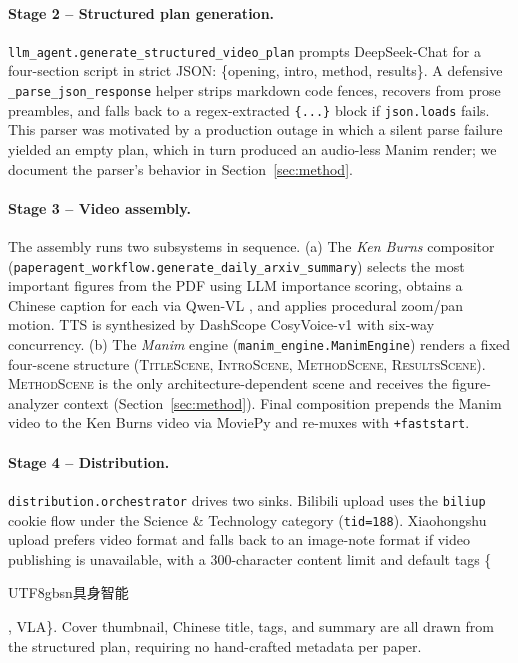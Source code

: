 \documentclass[11pt,a4paper]{article}
\begin{document}
\paragraph{Stage 2 -- Structured plan generation.}
\texttt{llm\_agent.generate\_structured\_video\_plan} prompts DeepSeek-Chat for a four-section script in strict JSON: \{opening, intro, method, results\}. A defensive \texttt{\_parse\_json\_response} helper strips markdown code fences, recovers from prose preambles, and falls back to a regex-extracted \texttt{\{...\}} block if \texttt{json.loads} fails. This parser was motivated by a production outage in which a silent parse failure yielded an empty plan, which in turn produced an audio-less Manim render; we document the parser's behavior in Section~\ref{sec:method}.

\paragraph{Stage 3 -- Video assembly.}
The assembly runs two subsystems in sequence.
(a) The \emph{Ken Burns} compositor (\texttt{paperagent\_workflow.generate\_daily\_arxiv\_summary}) selects the most important figures from the PDF using LLM importance scoring, obtains a Chinese caption for each via Qwen-VL \citep{bai2023qwenvl}, and applies procedural zoom/pan motion. TTS is synthesized by DashScope CosyVoice-v1 with six-way concurrency.
(b) The \emph{Manim} engine (\texttt{manim\_engine.ManimEngine}) renders a fixed four-scene structure (\textsc{TitleScene}, \textsc{IntroScene}, \textsc{MethodScene}, \textsc{ResultsScene}). \textsc{MethodScene} is the only architecture-dependent scene and receives the figure-analyzer context (Section~\ref{sec:method}). Final composition prepends the Manim video to the Ken Burns video via MoviePy and re-muxes with \texttt{+faststart}.

\paragraph{Stage 4 -- Distribution.}
\texttt{distribution.orchestrator} drives two sinks. Bilibili upload uses the \texttt{biliup} cookie flow under the Science \& Technology category (\texttt{tid=188}). Xiaohongshu upload prefers video format and falls back to an image-note format if video publishing is unavailable, with a 300-character content limit and default tags \{\begin{CJK}{UTF8}{gbsn}具身智能\end{CJK}, \textsc{VLA}\}. Cover thumbnail, Chinese title, tags, and summary are all drawn from the structured plan, requiring no hand-crafted metadata per paper.
\end{document}
